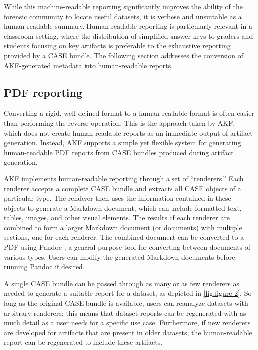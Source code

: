 \documentclass[preprint,12pt]{elsarticle}
\begin{document}
While this machine-readable reporting significantly improves the ability
of the forensic community to locate useful datasets, it is verbose and
unsuitable as a human-readable summary. Human-readable reporting is
particularly relevant in a classroom setting, where the distribution of
simplified answer keys to graders and students focusing on key artifacts
is preferable to the exhaustive reporting provided by a CASE bundle. The
following section addresses the conversion of AKF-generated metadata
into human-readable reports.

\subsection{PDF reporting}\label{pdf-reporting}

Converting a rigid, well-defined format to a human-readable format is
often easier than performing the reverse operation. This is the approach
taken by AKF, which does not create human-readable reports as an
immediate output of artifact generation. Instead, AKF supports a simple
yet flexible system for generating human-readable PDF reports from CASE
bundles produced during artifact generation.

AKF implements human-readable reporting through a set of ``renderers.''
Each renderer accepts a complete CASE bundle and extracts all CASE
objects of a particular type. The renderer then uses the information
contained in these objects to generate a Markdown document, which can
include formatted text, tables, images, and other visual elements. The
results of each renderer are combined to form a larger Markdown document
(or documents) with multiple sections, one for each renderer. The
combined document can be converted to a PDF using Pandoc
\citep{macfarlanePandoc2025}, a general-purpose tool for converting
between documents of various types. Users can modify the generated
Markdown documents before running Pandoc if desired.

A single CASE bundle can be passed through as many or as few renderers
as needed to generate a suitable report for a dataset, as depicted in
\autoref{fig:figure-2}. So long as the original CASE bundle is
available, users can reanalyze datasets with arbitrary renderers; this
means that dataset reports can be regenerated with as much detail as a
user needs for a specific use case. Furthermore, if new renderers are
developed for artifacts that are present in older datasets, the
human-readable report can be regenerated to include these artifacts.
\end{document}
